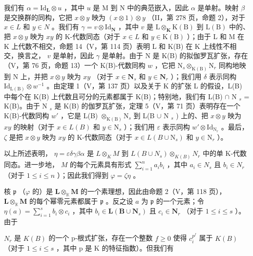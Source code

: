 我们有 \(\alpha = \mathrm{Id}_{\mathbf{L}} \otimes u\) ，其中 \(u\) 是 M 到 N 中的典范嵌入，因此 \(\alpha\) 是单射。映射 \(\beta\) 是交换群的同构，它把 \(x \otimes y\) 映为 \((x \otimes 1) \otimes y\) （II，第 278 页，命题 2），对于 \(x \in L\) 和 \(y \in N\) 。我们有 \(\gamma = v \otimes \mathrm{Id}_{\mathbf{N}}\) ，其中 \(v\) 是 \(\mathrm{L} \otimes_{\mathbf{K}} \mathrm{K}(\mathrm{B})\) 到 \(\mathrm{L}(\mathrm{B})\) 中的、把 \(x \otimes y\) 映为 \(xy\) 的 K-代数同态（对于 \(x \in L\) 和 \(y \in \mathrm{K}(\mathrm{B})\) ）；由于 L 和 M 在 K 上代数不相交，命题 14（V，第 114 页）表明 L 和 K(B) 在 K 上线性不相交，换言之， \(v\) 是单射，因此 \(\gamma\) 是单射。由于 N 是 K(B) 的拟伽罗瓦扩张，存在（V，第 76 页，命题 13）一个 K(B)-代数同构 \(w\) ，它把 \(\mathrm{N}_s \otimes_{\mathrm{K}(\mathrm{B})} \mathrm{N}_r\) 同构地映到 N 上，并把 \(x \otimes y\) 映为 \(xy\) （对于 \(x \in \mathbf{N}_s\) 和 \(y \in \mathbf{N}_r\) ）；我们用 \(\delta\) 表示同构 \(\mathrm{Id}_{\mathrm{L(B)}} \otimes w^{-1}\) 。由定理 1（V，第 137 页）以及关于 K 的扩张 L 的假设，L(B) 中每个在 K(B) 上代数且可分的元素都属于 K(B)；特别地，我们有 L(B) \(\cap\) N \(_s\) = K(B)。由于 N \(_s\) 是 K(B) 的伽罗瓦扩张，定理 5（V，第 71 页）表明存在一个 K(B)-代数同构 \(w'\) ，它是 L(B) \(\otimes_{\mathrm{K(B)}} \mathrm{N}_s\) 到 L(B \(\cup\) N \(_s\) ) 上的、把 \(x \otimes y\) 映为 \(xy\) 的映射（对于 \(x \in L(B)\) 和 \(y \in \mathrm{N}_s\) ）；我们用 \(\varepsilon\) 表示同构 \(w' \otimes \mathrm{Id}_{\mathrm{N}_r}\) 。最后， \(\zeta\) 是把 \(x \otimes y\) 映为 \(xy\) 的 K-代数同态（对于 \(x \in L(B \cup \mathrm{N}_s)\) 和 \(y \in \mathrm{N}_r\) ）。

以上所述表明， \(\eta = \varepsilon \delta \gamma \beta \alpha\) 是 \(L \otimes_{K} M\) 到 \(L(B \cup N_s) \otimes_{K(B)} N_r\) 中的单 K-代数同态。进一步地， \(M\) 的每个元素具有形式 \(\sum_{i=1}^{n} a_i b_i\) ，其中 \(a_i \in N_s\) 且 \(b_i \in N_r\) （对于 \(1 \leqslant i \leqslant n\) ）；因此我们得到 \(\varphi = \zeta \eta\) 。

核 \(\mathfrak{p}\) （\(\varphi\) 的）是 \(\mathbf{L} \otimes_{\mathbb{K}} \mathbf{M}\) 的一个素理想，因此由命题 2（V，第 118 页）， \(\mathbf{L} \otimes_{\mathbb{K}} \mathbf{M}\) 的每个幂零元素都属于 \(\mathfrak{p}\) 。反之设 \(a\) 为 \(\mathfrak{p}\) 的一个元素；令 \(\eta(a) = \sum_{i=1}^{s} b_i \otimes c_i\) ，其中 \(b_i \in \mathbf{L}(\mathbf{B} \cup \mathbf{N}_s)\) 且 \(c_i \in \mathbf{N}_r\) （对于 \(1 \leqslant i \leqslant s\) ）。由于

\(N_{r}\) 是 \(K(B)\) 的一个 p-根式扩张，存在一个整数 \(f \geqslant 0\) 使得 \(c_{i}^{p^{f}}\) 属于 \(K(B)\) （对于 \(1 \leqslant i \leqslant s\) ，其中 p 是 K 的特征指数）。但我们有

